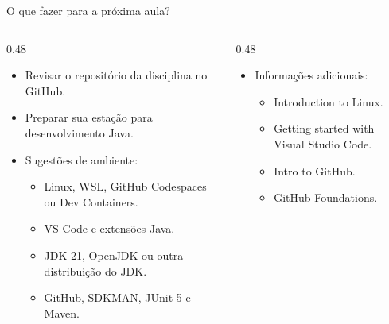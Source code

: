 \begin{frame}{O que fazer para a próxima aula?}
\scriptsize
\begin{columns}[T,onlytextwidth]
\begin{column}{0.48\textwidth}
\begin{itemize}
  \item Revisar o repositório da disciplina no GitHub.
  \item Preparar sua estação para desenvolvimento Java.
  \item Sugestões de ambiente:
    \begin{itemize}
      \item Linux, WSL, GitHub Codespaces ou Dev Containers.
      \item VS Code e extensões Java.
      \item JDK 21, OpenJDK ou outra distribuição do JDK.
      \item GitHub, SDKMAN, JUnit 5 e Maven.
    \end{itemize}
\end{itemize}
\end{column}
\begin{column}{0.48\textwidth}
\begin{itemize}
  \item Informações adicionais:
    \begin{itemize}
      \item Introduction to Linux.
      \item Getting started with Visual Studio Code.
      \item Intro to GitHub.
      \item GitHub Foundations.
    \end{itemize}
\end{itemize}
\end{column}
\end{columns}
\end{frame}

